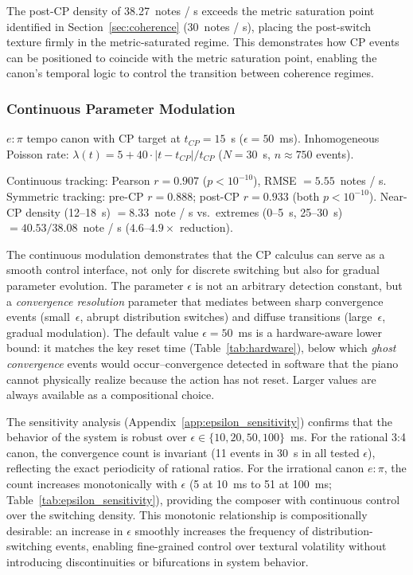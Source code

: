 \documentclass[a4paper]{article}
\theoremstyle{definition}
\theoremstyle{remark}
\begin{document}
The post-CP density of 38.27~notes / s exceeds the metric saturation point identified in Section~\ref{sec:coherence} (30~notes / s), placing the post-switch texture firmly in the metric-saturated regime. This demonstrates how CP events can be positioned to coincide with the metric saturation point, enabling the canon's temporal logic to control the transition between coherence regimes.

\subsubsection{Continuous Parameter Modulation}

$e:\pi$ tempo canon with CP target at $t_{CP} = 15$~s ($\epsilon = 50$~ms). Inhomogeneous Poisson rate: $\lambda(t) = 5 + 40 \cdot |t - t_{CP}| / t_{CP}$ ($N = 30$~s, $n \approx 750$ events).

Continuous tracking: Pearson $r = 0.907$ ($p < 10^{-10}$), RMSE $= 5.55$~notes / s. Symmetric tracking: pre-CP $r = 0.888$; post-CP $r = 0.933$ (both $p < 10^{-10}$). Near-CP density (12--18~s) $= 8.33$~note / s vs.\ extremes (0--5~s, 25--30~s) $= 40.53/38.08$~note / s ($4.6$--$4.9\times$ reduction).

The continuous modulation demonstrates that the CP calculus can serve as a smooth control interface, not only for discrete switching but also for gradual parameter evolution. The parameter $\epsilon$ is not an arbitrary detection constant, but a \emph{convergence resolution} parameter that mediates between sharp convergence events (small~$\epsilon$, abrupt distribution switches) and diffuse transitions (large~$\epsilon$, gradual modulation). The default value $\epsilon = 50$~ms is a hardware-aware lower bound: it matches the key reset time (Table~\ref{tab:hardware}), below which \emph{ghost convergence} events would occur--convergence detected in software that the piano cannot physically realize because the action has not reset. Larger values are always available as a compositional choice.

The sensitivity analysis (Appendix~\ref{app:epsilon_sensitivity}) confirms that the behavior of the system is robust over $\epsilon \in \{10, 20, 50, 100\}$~ms. For the rational 3:4 canon, the convergence count is invariant (11 events in 30~s in all tested $\epsilon$), reflecting the exact periodicity of rational ratios. For the irrational canon $e:\pi$, the count increases monotonically with $\epsilon$ (5 at 10~ms to 51 at 100~ms; Table~\ref{tab:epsilon_sensitivity}), providing the composer with continuous control over the switching density. This monotonic relationship is compositionally desirable: an increase in $\epsilon$ smoothly increases the frequency of distribution-switching events, enabling fine-grained control over textural volatility without introducing discontinuities or bifurcations in system behavior.
\end{document}
